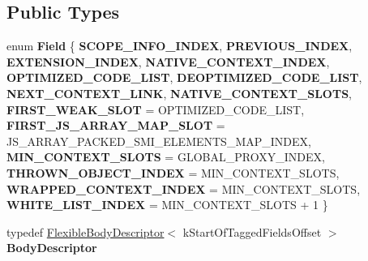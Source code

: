 \subsection*{Public Types}
\begin{DoxyCompactItemize}
\item 
\mbox{\label{classv8_1_1internal_1_1Context_a7a43120c7c95a95be912a46217274266}} 
enum {\bfseries Field} \{ \newline
{\bfseries S\+C\+O\+P\+E\+\_\+\+I\+N\+F\+O\+\_\+\+I\+N\+D\+EX}, 
{\bfseries P\+R\+E\+V\+I\+O\+U\+S\+\_\+\+I\+N\+D\+EX}, 
{\bfseries E\+X\+T\+E\+N\+S\+I\+O\+N\+\_\+\+I\+N\+D\+EX}, 
{\bfseries N\+A\+T\+I\+V\+E\+\_\+\+C\+O\+N\+T\+E\+X\+T\+\_\+\+I\+N\+D\+EX}, 
\newline
{\bfseries O\+P\+T\+I\+M\+I\+Z\+E\+D\+\_\+\+C\+O\+D\+E\+\_\+\+L\+I\+ST}, 
{\bfseries D\+E\+O\+P\+T\+I\+M\+I\+Z\+E\+D\+\_\+\+C\+O\+D\+E\+\_\+\+L\+I\+ST}, 
{\bfseries N\+E\+X\+T\+\_\+\+C\+O\+N\+T\+E\+X\+T\+\_\+\+L\+I\+NK}, 
{\bfseries N\+A\+T\+I\+V\+E\+\_\+\+C\+O\+N\+T\+E\+X\+T\+\_\+\+S\+L\+O\+TS}, 
\newline
{\bfseries F\+I\+R\+S\+T\+\_\+\+W\+E\+A\+K\+\_\+\+S\+L\+OT} = O\+P\+T\+I\+M\+I\+Z\+E\+D\+\_\+\+C\+O\+D\+E\+\_\+\+L\+I\+ST, 
{\bfseries F\+I\+R\+S\+T\+\_\+\+J\+S\+\_\+\+A\+R\+R\+A\+Y\+\_\+\+M\+A\+P\+\_\+\+S\+L\+OT} = J\+S\+\_\+\+A\+R\+R\+A\+Y\+\_\+\+P\+A\+C\+K\+E\+D\+\_\+\+S\+M\+I\+\_\+\+E\+L\+E\+M\+E\+N\+T\+S\+\_\+\+M\+A\+P\+\_\+\+I\+N\+D\+EX, 
{\bfseries M\+I\+N\+\_\+\+C\+O\+N\+T\+E\+X\+T\+\_\+\+S\+L\+O\+TS} = G\+L\+O\+B\+A\+L\+\_\+\+P\+R\+O\+X\+Y\+\_\+\+I\+N\+D\+EX, 
{\bfseries T\+H\+R\+O\+W\+N\+\_\+\+O\+B\+J\+E\+C\+T\+\_\+\+I\+N\+D\+EX} = M\+I\+N\+\_\+\+C\+O\+N\+T\+E\+X\+T\+\_\+\+S\+L\+O\+TS, 
\newline
{\bfseries W\+R\+A\+P\+P\+E\+D\+\_\+\+C\+O\+N\+T\+E\+X\+T\+\_\+\+I\+N\+D\+EX} = M\+I\+N\+\_\+\+C\+O\+N\+T\+E\+X\+T\+\_\+\+S\+L\+O\+TS, 
{\bfseries W\+H\+I\+T\+E\+\_\+\+L\+I\+S\+T\+\_\+\+I\+N\+D\+EX} = M\+I\+N\+\_\+\+C\+O\+N\+T\+E\+X\+T\+\_\+\+S\+L\+O\+TS + 1
 \}
\item 
\mbox{\label{classv8_1_1internal_1_1Context_a370c19f01ee93db59d781af5e7ab74e5}} 
typedef \mbox{\hyperlink{classv8_1_1internal_1_1FlexibleBodyDescriptor}{Flexible\+Body\+Descriptor}}$<$ k\+Start\+Of\+Tagged\+Fields\+Offset $>$ {\bfseries Body\+Descriptor}
\end{DoxyCompactItemize}
